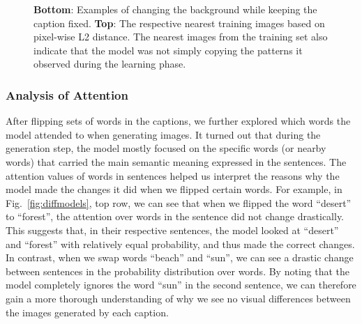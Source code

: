 \documentclass{article} %
\newcommand{\Figref}[1]{Fig.~\ref{#1}}
\begin{document}
\begin{figure}[!t]
\begin{center}
%
\quad
%
\end{center}
\caption{\textbf{Bottom}: Examples of changing the background while keeping the caption fixed. \textbf{Top}: The respective nearest training images based on pixel-wise L2 distance. The nearest images from the training set also indicate that the model was not simply copying the patterns it observed during the learning phase.}
\label{fig:genimages2}
\vspace{-0.1in}
\end{figure}

\subsubsection{Analysis of Attention}
\vspace{-0.05in}
After flipping sets of words in the captions, we further explored which words the model attended to when generating images. It turned out that during the generation step, the model mostly focused on the specific words (or nearby words) that carried the main semantic meaning expressed in the sentences. The attention values of words in sentences helped us interpret the reasons why the model made the changes it did when we flipped certain words. For example, in \Figref{fig:diffmodels}, top row, we can see that when we flipped the word ``desert'' to ``forest'', the attention over words in the sentence did not change drastically. This suggests that, in their respective sentences, the model looked at ``desert'' and ``forest'' with relatively equal probability, and thus made the correct changes. In contrast, when we swap words ``beach'' and ``sun'', we can see a drastic change between sentences in the probability distribution over words. By noting that the model completely ignores the word ``sun'' in the second sentence, we can therefore gain a more thorough understanding of why we see no visual differences between the images generated by each caption.
\end{document}
